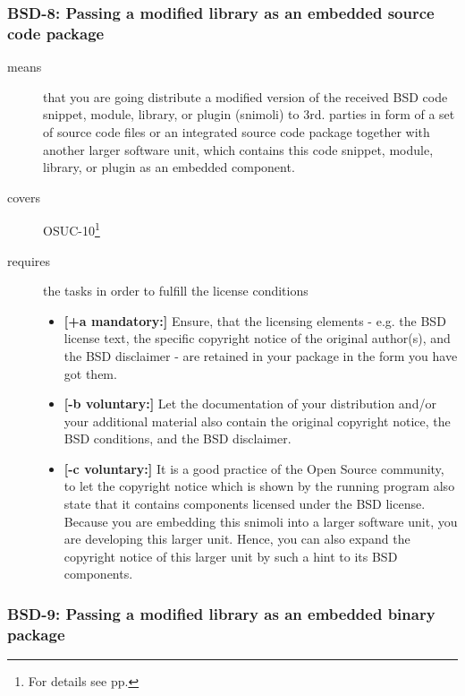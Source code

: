 \subsubsection{BSD-8: Passing a modified library as an embedded source code
package}
\label{OSUC-10-BSD}
\begin{description}
\item[means] that you are going distribute a modified version of the received
BSD code snippet, module, library, or plugin (snimoli) to 3rd. parties in form
of a set of source code files or an integrated source code package together with
another larger software unit, which contains this code snippet, module, library,
or plugin as an embedded component.
\item[covers] OSUC-10\footnote{For details see pp. \pageref{OSUC-10-DEF}}
\item[requires] the tasks in order to fulfill the license conditions
\begin{itemize}
  \item \textbf{[+a mandatory:]} Ensure, that the licensing elements - e.g.
  the BSD license text, the specific copyright notice of the original author(s),
  and the BSD disclaimer - are retained in your package in the form you have got
  them.
  \item \textbf{[-b voluntary:]} Let the documentation of your distribution
  and/or your additional material also contain the original copyright notice, the
  BSD conditions, and the BSD disclaimer.
 \item \textbf{[-c voluntary:]} It is a good practice of the Open Source
  community, to let the copyright notice which is shown by the running program
  also state that it contains components licensed under the BSD license. Because
  you are embedding this snimoli into a larger software unit, you are
  developing this larger unit. Hence, you can also expand the copyright notice
  of this larger unit by such a hint to its BSD components.
\end{itemize}
\end{description}


\subsubsection{BSD-9: Passing a modified library as an embedded binary
package}

